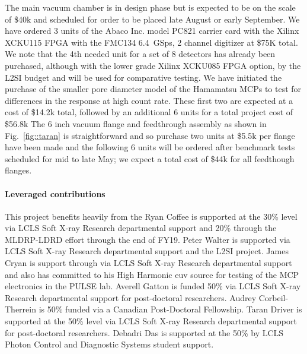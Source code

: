 \documentclass[aps]{revtex4}
\begin{document}
The main vacuum chamber is in design phase but is expected to be on the scale of \$40k and scheduled for order to be placed late August or early September.
We have ordered 3 units of the Abaco Inc. model PC821 carrier card with the Xilinx XCKU115 FPGA with the FMC134 6.4~GSps, 2 channel digitizer at \$75K total.
We note that the 4th needed unit for a set of 8 detectors has already been purchased, although with the lower grade Xilinx XCKU085 FPGA option, by the L2SI budget and will be used for comparative testing.
We have initiated the purchase of the smaller pore diameter model of the Hamamatsu MCPs to test for differences in the response at high count rate.
These first two are expected at a cost of \$14.2k total, followed by an additional 6 units for a total project cost of \$56.8k
The 6 inch vacuum flange and feedthrough assembly as shown in Fig.~\ref{fig::taran} is straightforward and so purchase two units at \$5.5k per flange have been made and the following 6 units will be ordered after benchmark tests scheduled for mid to late May; we expect a total cost of \$44k for all feedthough flanges.






\paragraph*{Leveraged contributions}
This project benefits heavily from the 
Ryan Coffee is supported at the 30\% level via LCLS Soft X-ray Research departmental support and 20\% through the MLDRP-LDRD effort through the end of FY19. 
Peter Walter is supported via LCLS Soft X-ray Research departmental support and the L2SI project.  
James Cryan is support through via LCLS Soft X-ray Research departmental support and also has committed to his High Harmonic euv source for testing of the MCP electronics in the PULSE lab.
Averell Gatton is funded 50\% via LCLS Soft X-ray Research departmental support for post-doctoral researchers.
Audrey Corbeil-Therrein is 50\% funded via a Canadian Post-Doctoral Fellowship.
Taran Driver is supported at the 50\% level via LCLS Soft X-ray Research departmental support for post-doctoral researchers.
Debadri Das is supported at the 50\% by LCLS Photon Control and Diagnostic Systems student support.
\end{document}
